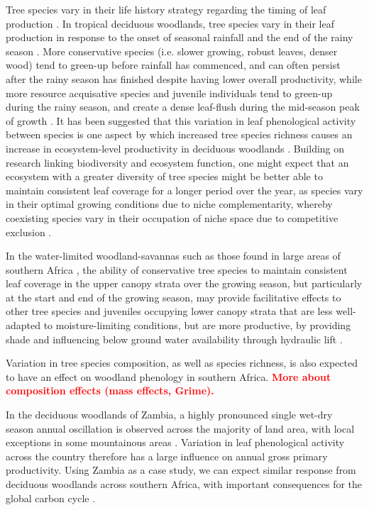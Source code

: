 \documentclass[11pt,a4paper]{article}
\newcommand{\todo}[1]{\textcolor{red}{\textbf{#1}}}   %
\begin{document}
Tree species vary in their life history strategy regarding the timing of leaf production \citep{}. In tropical deciduous woodlands, tree species vary in their leaf production in response to the onset of seasonal rainfall and the end of the rainy season \citep{}. More conservative species (i.e. slower growing, robust leaves, denser wood) tend to green-up before rainfall has commenced, and can often persist after the rainy season has finished despite having lower overall productivity, while more resource acquisative species and juvenile individuals tend to green-up during the rainy season, and create a dense leaf-flush during the mid-season peak of growth \citep{}. It has been suggested that this variation in leaf phenological activity between species is one aspect by which increased tree species richness causes an increase in ecosystem-level productivity in deciduous woodlands \citep{}. Building on research linking biodiversity and ecosystem function, one might expect that an ecosystem with a greater diversity of tree species might be better able to maintain consistent leaf coverage for a longer period over the year, as species vary in their optimal growing conditions due to niche complementarity, whereby coexisting species vary in their occupation of niche space due to competitive exclusion \citep{}. 

In the water-limited woodland-savannas such as those found in large areas of southern Africa \citep{}, the ability of conservative tree species to maintain consistent leaf coverage in the upper canopy strata over the growing season, but particularly at the start and end of the growing season, may provide facilitative effects to other tree species and juveniles occupying lower canopy strata that are less well-adapted to moisture-limiting conditions, but are more productive, by providing shade and influencing below ground water availability through hydraulic lift \citep{}. 

Variation in tree species composition, as well as species richness, is also expected to have an effect on woodland phenology in southern Africa. \todo{More about composition effects (mass effects, Grime).}

In the deciduous woodlands of Zambia, a highly pronounced single wet-dry season annual oscillation is observed across the majority of land area, with local exceptions in some mountainous areas \citep{}. Variation in leaf phenological activity across the country therefore has a large influence on annual gross primary productivity. Using Zambia as a case study, we can expect similar response from deciduous woodlands across southern Africa, with important consequences for the global carbon cycle \citep{}. 
\end{document}
